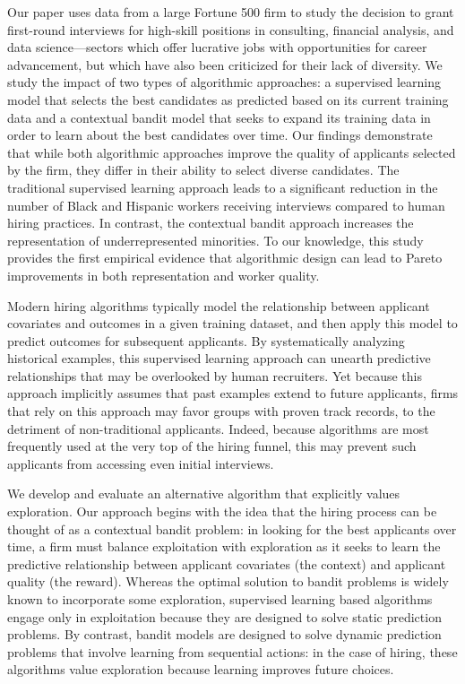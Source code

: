 \documentclass[crop,noquery,editorname,historyrev,nosurname,runningno,sepcount]{RESTUD}
\begin{document}
Our paper uses data from a large Fortune 500 firm to study the decision to grant first-round interviews for high-skill positions in consulting, financial analysis, and data science---sectors which offer lucrative jobs with opportunities for career advancement, but which have also been criticized for their lack of diversity.  We study the impact of two types of algorithmic approaches: a supervised learning model that selects the best candidates as predicted based on its current training data and a contextual bandit model that seeks to expand its training data in order to learn about the best candidates over time.  Our findings demonstrate that while both algorithmic approaches improve the quality of applicants selected by the firm, they differ in their ability to select diverse candidates. The traditional supervised learning approach leads to a significant reduction in the number of Black and Hispanic workers receiving interviews compared to human hiring practices.  In contrast, the contextual bandit approach increases the representation of underrepresented minorities.  To our knowledge, this study provides the first empirical evidence that algorithmic design can lead to Pareto improvements in both representation and worker quality.

Modern hiring algorithms typically model the relationship between applicant covariates and outcomes in a given training dataset, and then apply this model to predict outcomes for subsequent applicants.  By systematically analyzing historical examples, this supervised learning approach can unearth predictive relationships that may be overlooked by human recruiters. Yet because this approach implicitly assumes that past examples extend to future applicants, firms that rely on this approach may favor groups with proven track records, to the detriment of non-traditional applicants. Indeed, because algorithms are most frequently used at the very top of the hiring funnel, this may prevent such applicants from accessing even initial interviews.

We develop and evaluate an alternative algorithm that explicitly values exploration.  Our approach begins with the idea that the hiring process can be thought of as a contextual bandit problem: in looking for the best applicants over time, a firm must balance exploitation with exploration as it seeks to learn the predictive relationship between applicant covariates (the context) and applicant quality (the reward). Whereas the optimal solution to bandit problems is widely known to incorporate some exploration, supervised learning based algorithms engage only in exploitation because they are designed to solve static prediction problems.  By contrast, bandit models are designed to solve dynamic prediction problems that involve learning from sequential actions: in the case of hiring, these algorithms value exploration because learning improves future choices.
\end{document}
